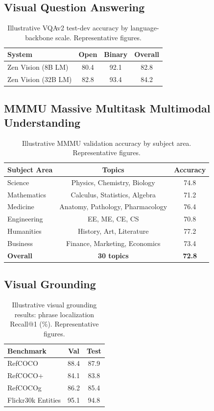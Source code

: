 \documentclass[11pt,a4paper]{article}
\begin{document}
\subsection{Visual Question Answering}

\begin{table}[H]
\centering
\caption{Illustrative VQAv2 test-dev accuracy by language-backbone scale. Representative figures.}
\label{tab:vqa}
\begin{tabular}{lccc}
\toprule
System & Open & Binary & Overall \\
\midrule
Zen Vision (8B LM) & 80.4 & 92.1 & 82.8 \\
Zen Vision (32B LM) & 82.8 & 93.4 & 84.2 \\
\bottomrule
\end{tabular}
\end{table}

\subsection{MMMU Massive Multitask Multimodal Understanding}

\begin{table}[H]
\centering
\caption{Illustrative MMMU validation accuracy by subject area. Representative figures.}
\label{tab:mmmu}
\begin{tabular}{lcc}
\toprule
Subject Area & Topics & Accuracy \\
\midrule
Science & Physics, Chemistry, Biology & 74.8 \\
Mathematics & Calculus, Statistics, Algebra & 71.2 \\
Medicine & Anatomy, Pathology, Pharmacology & 76.4 \\
Engineering & EE, ME, CE, CS & 70.8 \\
Humanities & History, Art, Literature & 77.2 \\
Business & Finance, Marketing, Economics & 73.4 \\
\midrule
\textbf{Overall} & \textbf{30 topics} & \textbf{72.8} \\
\bottomrule
\end{tabular}
\end{table}

\subsection{Visual Grounding}

\begin{table}[H]
\centering
\caption{Illustrative visual grounding results: phrase localization Recall@1 (\%). Representative figures.}
\label{tab:grounding}
\begin{tabular}{lcc}
\toprule
Benchmark & Val & Test \\
\midrule
RefCOCO & 88.4 & 87.9 \\
RefCOCO+ & 84.1 & 83.8 \\
RefCOCOg & 86.2 & 85.4 \\
Flickr30k Entities & 95.1 & 94.8 \\
\bottomrule
\end{tabular}
\end{table}
\end{document}
